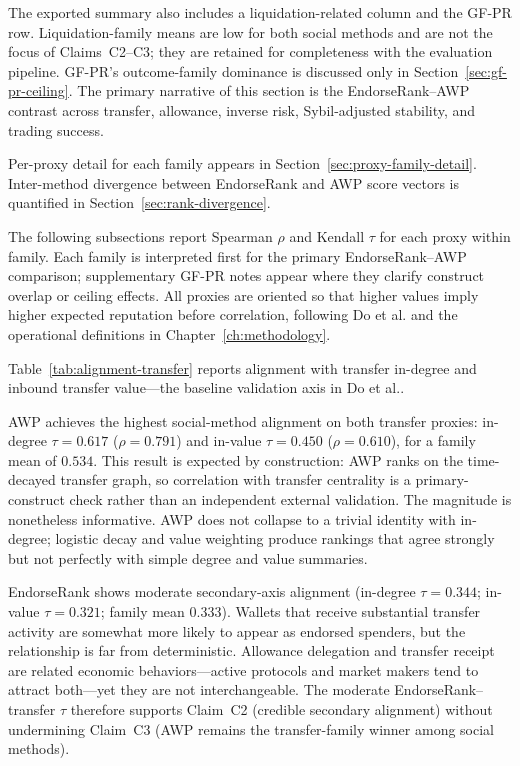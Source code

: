 The exported summary also includes a liquidation-related column and the GF-PR row. Liquidation-family means are low for both social methods and are not the focus of Claims~C2--C3; they are retained for completeness with the evaluation pipeline. GF-PR's outcome-family dominance is discussed only in Section~\ref{sec:gf-pr-ceiling}. The primary narrative of this section is the EndorseRank--AWP contrast across transfer, allowance, inverse risk, Sybil-adjusted stability, and trading success.

Per-proxy detail for each family appears in Section~\ref{sec:proxy-family-detail}. Inter-method divergence between EndorseRank and AWP score vectors is quantified in Section~\ref{sec:rank-divergence}.


The following subsections report Spearman $\rho$ and Kendall $\tau$ for each proxy within family. Each family is interpreted first for the primary EndorseRank--AWP comparison; supplementary GF-PR notes appear where they clarify construct overlap or ceiling effects. All proxies are oriented so that higher values imply higher expected reputation before correlation, following Do et al. and the operational definitions in Chapter~\ref{ch:methodology}.


Table~\ref{tab:alignment-transfer} reports alignment with transfer in-degree and inbound transfer value---the baseline validation axis in Do et al..



AWP achieves the highest social-method alignment on both transfer proxies: in-degree $\tau=0.617$ ($\rho=0.791$) and in-value $\tau=0.450$ ($\rho=0.610$), for a family mean of $0.534$. This result is expected by construction: AWP ranks on the time-decayed transfer graph, so correlation with transfer centrality is a primary-construct check rather than an independent external validation. The magnitude is nonetheless informative. AWP does not collapse to a trivial identity with in-degree; logistic decay and value weighting produce rankings that agree strongly but not perfectly with simple degree and value summaries.

EndorseRank shows moderate secondary-axis alignment (in-degree $\tau=0.344$; in-value $\tau=0.321$; family mean $0.333$). Wallets that receive substantial transfer activity are somewhat more likely to appear as endorsed spenders, but the relationship is far from deterministic. Allowance delegation and transfer receipt are related economic behaviors---active protocols and market makers tend to attract both---yet they are not interchangeable. The moderate EndorseRank--transfer $\tau$ therefore supports Claim~C2 (credible secondary alignment) without undermining Claim~C3 (AWP remains the transfer-family winner among social methods).

